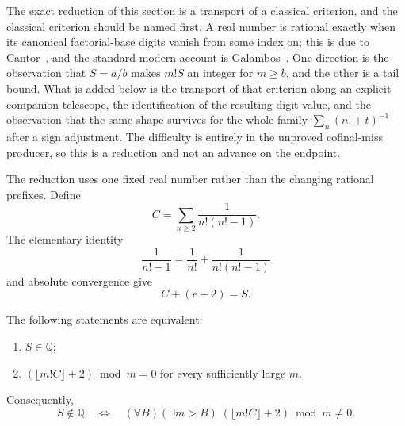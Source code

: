 \documentclass[11pt]{article}
\newcommand{\Ser}{S}
\begin{document}
The exact reduction of this section is a transport of a classical criterion,
and the classical criterion should be named first.  A real number is rational
exactly when its canonical factorial-base digits vanish from some index on;
this is due to Cantor~\cite{cantor1869}, and the standard modern account is
Galambos~\cite[Ch.~1]{galambos1976}.  One direction is the observation that
$S=a/b$ makes $m!S$ an integer for $m\ge b$, and the other is a tail bound.
What is added below is the transport of that criterion along an explicit
companion telescope, the identification of the resulting digit value, and the
observation that the same shape survives for the whole family
$\sum_n(n!+t)^{-1}$ after a sign adjustment.  The difficulty is entirely in the
unproved cofinal-miss producer, so this is a reduction and not an advance on
the endpoint.

The reduction uses one fixed real number rather
than the changing rational prefixes.  Define
\[
 C=\sum_{n\ge2}\frac1{n!(n!-1)}.
\]
The elementary identity
\[
 \frac1{n!-1}=\frac1{n!}+\frac1{n!(n!-1)}
\]
and absolute convergence give
\begin{equation}
 C+(e-2)=\Ser.                                      \label{eq:companion-decomposition}
\end{equation}

\begin{theorem}
\label{res:companion-orbit-rationality-boundary}
The following statements are equivalent:
\begin{enumerate}
\item $\Ser\in\mathbb Q$;
\item $(\lfloor m!C\rfloor+2)\bmod m=0$ for every sufficiently large $m$.
\end{enumerate}
Consequently,
\begin{equation}
 \Ser\notin\mathbb Q
 \quad\Longleftrightarrow\quad
 (\forall B)(\exists m>B)\;
   (\lfloor m!C\rfloor+2)\bmod m\ne0 .
 \label{eq:companion-cofinal}
\end{equation}
\end{theorem}
\end{document}
